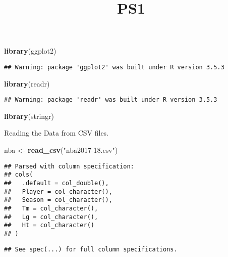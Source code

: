 \documentclass[]{article}
\title{PS1}
\author{}
\date{}
\newenvironment{Shaded}{\begin{snugshade}}{\end{snugshade}}
\newcommand{\KeywordTok}[1]{\textcolor[rgb]{0.13,0.29,0.53}{\textbf{#1}}}
\newcommand{\StringTok}[1]{\textcolor[rgb]{0.31,0.60,0.02}{#1}}
\newcommand{\NormalTok}[1]{#1}
\begin{document}
\maketitle

\begin{Shaded}
\begin{Highlighting}[]
\KeywordTok{library}\NormalTok{(ggplot2)}
\end{Highlighting}
\end{Shaded}

\begin{verbatim}
## Warning: package 'ggplot2' was built under R version 3.5.3
\end{verbatim}

\begin{Shaded}
\begin{Highlighting}[]
\KeywordTok{library}\NormalTok{(readr)}
\end{Highlighting}
\end{Shaded}

\begin{verbatim}
## Warning: package 'readr' was built under R version 3.5.3
\end{verbatim}

\begin{Shaded}
\begin{Highlighting}[]
\KeywordTok{library}\NormalTok{(stringr)}
\end{Highlighting}
\end{Shaded}

Reading the Data from CSV files.

\begin{Shaded}
\begin{Highlighting}[]
\NormalTok{nba <-}\StringTok{ }\KeywordTok{read_csv}\NormalTok{(}\StringTok{"nba2017-18.csv"}\NormalTok{)}
\end{Highlighting}
\end{Shaded}

\begin{verbatim}
## Parsed with column specification:
## cols(
##   .default = col_double(),
##   Player = col_character(),
##   Season = col_character(),
##   Tm = col_character(),
##   Lg = col_character(),
##   Ht = col_character()
## )
\end{verbatim}

\begin{verbatim}
## See spec(...) for full column specifications.
\end{verbatim}
\end{document}
